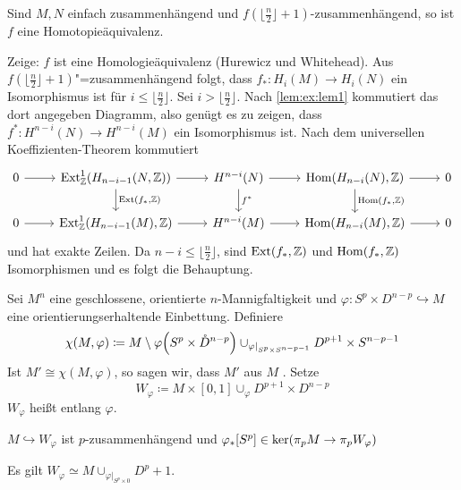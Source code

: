 \begin{proposition}
	Sind $M,N$ einfach zusammenhängend und $f(\lfloor \frac{n}{2}\rfloor +1)$-zusammenhängend, so ist $f$ eine Homotopieäquivalenz.
\end{proposition}
\begin{beweis}
	Zeige: $f$ ist eine Homologieäquivalenz (Hurewicz und Whitehead).
	Aus $f(\lfloor \frac{n}{2}\rfloor +1)$"=zusammenhängend folgt, dass $f_* \colon H_i(M) \to H_i(N)$ ein Isomorphismus ist für $i \le \lfloor \frac{n}{2} \rfloor$.
	Sei $i > \lfloor \frac{n}{2} \rfloor$.
	Nach \autoref{lem:ex:lem1} kommutiert das dort angegeben Diagramm, also genügt es zu zeigen, dass $f^* \colon H^{n-i}(N) \to H^{n-i}(M)$ ein Isomorphismus ist.
	Nach dem universellen Koeffizienten-Theorem kommutiert
	\[
		\begin{tikzcd}
			0 \rar & \Ext^1_\mathbb{Z} \enbrace*{H_{n-i-1}(N,\mathbb{Z})} \rar \dar["{\Ext(f_*,\mathbb{Z})}"] & H^{n-i}(N) \dar["f^*"] \rar & \Hom \enbrace*{H_{n-i}(N),\mathbb{Z}} \rar \dar["{\Hom(f_*,\mathbb{Z})}"]& 0 \\
			0 \rar & \Ext^1_\mathbb{Z} \enbrace*{H_{n-i-1}(M),\mathbb{Z}} \rar & H^{n-i}(M) \rar & \Hom \enbrace*{H_{n-i}(M),\mathbb{Z}} \rar & 0
		\end{tikzcd}
	\]
	und hat exakte Zeilen.
	Da $n-i \le \lfloor \frac{n}{2}\rfloor$, sind $\operatorname{Ext}(f_*,\mathbb{Z})$ und $\operatorname{Hom}(f_*,\mathbb{Z})$ Isomorphismen und es folgt die Behauptung.
\end{beweis}

\begin{definition}
	Sei $M^n$ eine geschlossene, orientierte $n$-Mannigfaltigkeit und $\varphi \colon S^p \times D^{n-p} \hookrightarrow M$ eine orientierungserhaltende Einbettung.
	Definiere 
	\[
		\chi(M,\varphi) \coloneqq M \setminus \varphi \enbrace*{S^p \times \mathring{D}^{n-p}} \cup_{\varphi|_{S^p\times S^{n-p-1}}} D^{p+1} \times S^{n-p-1}
	\]
	Ist $M' \cong \chi(M,\varphi)$, so sagen wir, dass $M'$ aus $M$ .
	Setze 
	\[
		W_\varphi \coloneqq M \times [0,1] \cup_\varphi D^{p+1} \times D^{n-p}
	\]
	$W_\varphi$ heißt  entlang $\varphi$.  
\end{definition}

\begin{lemma}
	$M \hookrightarrow W_\varphi$ ist $p$-zusammenhängend und $\varphi_*[S^p] \in \ker \enbrace*{\pi_p M \to \pi_p W_\varphi}$
\end{lemma}
\begin{beweis}
	Es gilt $W_\varphi \simeq M \cup_{\varphi|_{S^p \times 0}} D^p+1$.
\end{beweis}

